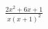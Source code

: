\documentclass[12]{article}
\begin{document}
\pagestyle{empty}
\Huge $\frac{2x^2+6x+1}{x(x+1)^2}$
\end{document}
